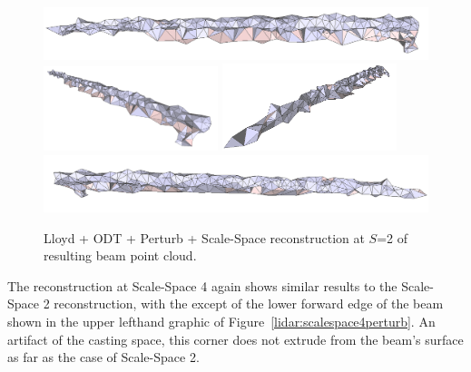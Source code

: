 \documentclass[12pt]{drexelthesis}
\begin{document}
\begin{figure}[!ht]
	\centering
		\includegraphics[width=5in]{real-lab-scans/optimizedNeat/scalespace2perturb00.png}
		\includegraphics[width=2in]{real-lab-scans/optimizedNeat/scalespace2perturb01.png}
		\includegraphics[width=2in]{real-lab-scans/optimizedNeat/scalespace2perturb02.png}
		\includegraphics[width=5in]{real-lab-scans/optimizedNeat/scalespace2perturb03.png}
		\caption[Lloyd + ODT + perturb +Scale-Space reconstruction at $S$=2 of segmented LiDAR data]{\centering Lloyd + ODT + Perturb + Scale-Space reconstruction at $S$=2 of resulting beam point cloud.}
	\label{lidar:scalespace2perturb}
\end{figure}

The reconstruction at Scale-Space 4 again shows similar results to the Scale-Space 2 reconstruction, with the except of the lower forward edge of the beam shown in the upper lefthand graphic of Figure~\ref{lidar:scalespace4perturb}. An artifact of the casting space, this corner does not extrude from the beam's surface as far as the case of Scale-Space 2.
\end{document}
